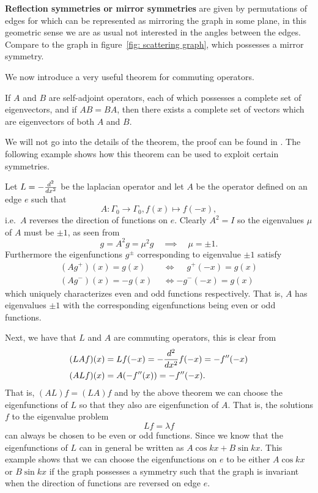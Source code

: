 \textbf{Reflection symmetries {\normalfont or} mirror symmetries} are given by permutations of edges for which can be represented as mirroring the graph in some plane, in this geometric sense we are as usual not interested in the angles between the edges. Compare to the graph in figure~\ref{fig: scattering graph}, which possesses a mirror symmetry.

We now introduce a very useful theorem for commuting operators.

\begin{theorem}\label{thm: commuting operators share eigenfunctions}
  If $A$ and $B$ are self-adjoint operators, each of which possesses a complete set of eigenvectors, and if $AB = BA$, then there exists a complete set of vectors which are eigenvectors of both $A$ and $B$.
\end{theorem}
We will not go into the details of the theorem, the proof can be found in \cite[p.~24]{ballentine}. The following example shows how this theorem can be used to exploit certain symmetries.

\begin{example}\label{ex: even odd eigenfunctions}
  Let $L = - \frac{d^2}{dx^2}$ be the laplacian operator and let $A$ be the operator defined on an edge $e$ such that
  \[
    A: \Gamma_0 \to \Gamma_0, f(x) \mapsto f(-x),
  \]
  i.e.\ $A$ reverses the direction of functions on $e$. Clearly $A^2 = I$ so the eigenvalues $\mu$ of $A$ must be $\pm 1$, as seen from
  \[
    g = A^2g = \mu^2g \quad\implies\quad \mu = \pm 1.
  \]
  Furthermore the eigenfunctions $g^\pm$ corresponding to eigenvalue $\pm 1$ satisfy
  \begin{align*}
    (Ag^+)(x) =  g(x)\phantom{-} &\iff \phantom{-}g^+(-x) = g(x) \\
    (Ag^-)(x) = -g(x) &\iff -g^-(-x) = g(x)
  \end{align*}
  which uniquely characterizes even and odd functions respectively. That is, $A$ has eigenvalues $\pm 1$ with the corresponding eigenfunctions being even or odd functions.

  Next, we have that $L$ and $A$ are commuting operators, this is clear from
  \begin{align*}
    (LAf)(x) &= Lf(-x) = -\frac{d^2}{dx^2}f(-x) = -f''(-x) \\
    (ALf)(x) &= A(-f''(x)) = -f''(-x).
  \end{align*}
  That is, $(AL)f = (LA)f$ and by the above theorem we can choose the eigenfunctions of $L$ so that they also are eigenfunction of $A$. That is, the solutions $f$ to the eigenvalue problem
  \[
    Lf = \lambda f
  \]
  can always be chosen to be even or odd functions. Since we know that the eigenfunctions of $L$ can in general be written as $A\cos kx + B\sin kx$. This example shows that we can choose the eigenfunctions on $e$ to be either $A\cos kx$ or $B\sin kx$ if the graph possesses a symmetry such that the graph is invariant when the direction of functions are reversed on edge $e$.
\end{example}

